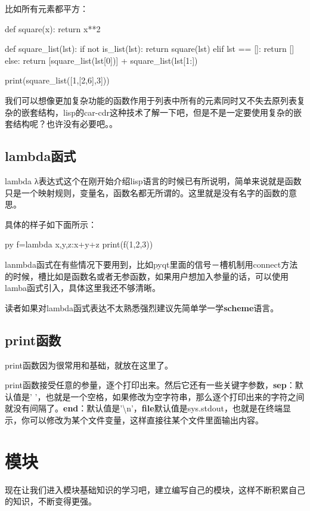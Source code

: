 \documentclass[12pt,oneside]{book}
\begin{document}
\begin{common-format}
比如所有元素都平方：
\begin{tcbpython}[]
def square(x):
    return x**2

def square_list(lst):
    if  not  is_list(lst):
        return square(lst)
    elif lst == []:
        return []
    else:
        return [square_list(lst[0])] + square_list(lst[1:])

print(square_list([1,[2,6],3]))
\end{tcbpython}

我们可以想像更加复杂功能的函数作用于列表中所有的元素同时又不失去原列表复杂的嵌套结构，lisp的car-cdr这种技术了解一下吧，但是不是一定要使用复杂的嵌套结构呢？也许没有必要吧。。


\section{lambda函式}
lambda
λ表达式这个在刚开始介绍lisp语言的时候已有所说明，简单来说就是函数只是一个映射规则，变量名，函数名都无所谓的。这里就是没有名字的函数的意思。

具体的样子如下面所示：
\begin{xverbatim}[129]{py}
f=lambda x,y,z:x+y+z
print(f(1,2,3))
\end{xverbatim}

lanmbda函式在有些情况下要用到，比如pyqt里面的信号－槽机制用connect方法的时候，槽比如是函数名或者无参函数，如果用户想加入参量的话，可以使用lamba函式引入，具体这里我还不够清晰。

读者如果对lambda函式表达不太熟悉强烈建议先简单学一学\textbf{scheme}语言。

\section{print函数}
print函数因为很常用和基础，就放在这里了。

print函数接受任意的参量，逐个打印出来。然后它还有一些关键字参数，\textbf{sep}：默认值是' '，也就是一个空格，如果修改为空字符串，那么逐个打印出来的字符之间就没有间隔了。\textbf{end}：默认值是'\textbackslash{}n'，\textbf{file}默认值是sys.stdout，也就是在终端显示，你可以修改为某个文件变量，这样直接往某个文件里面输出内容。



\chapter{模块}
现在让我们进入模块基础知识的学习吧，建立编写自己的模块，这样不断积累自己的知识，不断变得更强。


\end{common-format}
\end{document}
